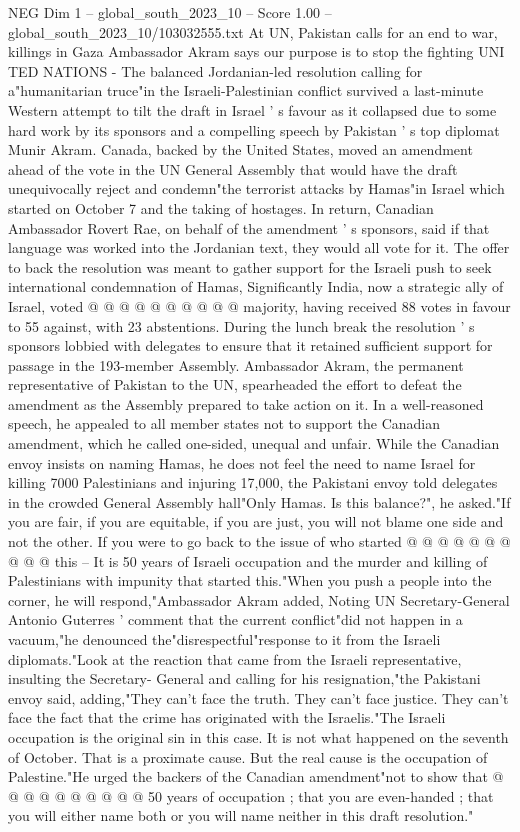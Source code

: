 \begin{textsample}{NEG Dim 1 – global\_south\_2023\_10 – Score 1.00 – global\_south\_2023\_10/103032555.txt}  \label{ex:f1_neg_404}
At UN, Pakistan calls for an end to war, killings in Gaza Ambassador Akram says our purpose is to stop the fighting UNI TED NATIONS - The balanced Jordanian-led resolution calling for a"humanitarian truce"in the Israeli-Palestinian conflict survived a last-minute Western attempt to tilt the draft in Israel ' s favour as it collapsed due to some hard work by its sponsors and a compelling speech by Pakistan ' s top diplomat Munir Akram.
Canada, backed by the United States, moved an amendment ahead of the vote in the UN General Assembly that would have the draft unequivocally reject and condemn"the terrorist attacks by Hamas"in Israel which started on October 7 and the taking of hostages.
In return, Canadian Ambassador Rovert Rae, on behalf of the amendment ' s sponsors, said if that language was worked into the Jordanian text, they would all vote for it.
The offer to back the resolution was meant to gather support for the Israeli push to seek international condemnation of Hamas, Significantly India, now a strategic ally of Israel, voted @ @ @ @ @ @ @ @ @ @ majority, having received 88 votes in favour to 55 against, with 23 abstentions.
During the lunch break the resolution ' s sponsors lobbied with delegates to ensure that it retained sufficient support for passage in the 193-member Assembly.
Ambassador Akram, the permanent representative of Pakistan to the UN, spearheaded the effort to defeat the amendment as the Assembly prepared to take action on it.
In a well-reasoned speech, he appealed to all member states not to support the Canadian amendment, which he called one-sided, unequal and unfair.
While the Canadian envoy insists on naming Hamas, he does not feel the need to name Israel for killing 7000 Palestinians and injuring 17,000, the Pakistani envoy told delegates in the crowded General Assembly hall"Only Hamas.
Is this balance?", he asked."If you are fair, if you are equitable, if you are just, you will not blame one side and not the other.
If you were to go back to the issue of who started @ @ @ @ @ @ @ @ @ @ this -- It is 50 years of Israeli occupation and the murder and killing of Palestinians with impunity that started this."When you push a people into the corner, he will respond,"Ambassador Akram added, Noting UN Secretary-General Antonio Guterres ' comment that the current conflict"did not happen in a vacuum,"he denounced the"disrespectful"response to it from the Israeli diplomats."Look at the reaction that came from the Israeli representative, insulting the Secretary- General and calling for his resignation,"the Pakistani envoy said, adding,"They can't face the truth.
They can't face justice.
They can't face the fact that the crime has originated with the Israelis."The Israeli occupation is the original sin in this case.
It is not what happened on the seventh of October.
That is a proximate cause.
But the real cause is the occupation of Palestine."He urged the backers of the Canadian amendment"not to show that @ @ @ @ @ @ @ @ @ @ 50 years of occupation ; that you are even-handed ; that you will either name both or you will name neither in this draft resolution."

\end{textsample}
